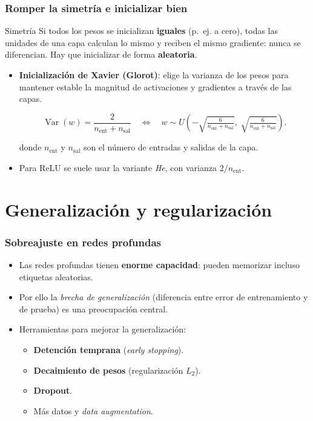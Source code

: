 \documentclass[aspectratio=169, 10pt]{beamer}
\newcommand{\Var}{\operatorname{Var}}
\newcommand{\formula}[1]{%
	\begin{tcolorbox}[colback=UCMBlue!8, colframe=UCMBlue, arc=4pt,
		boxsep=2pt, left=6pt, right=6pt, top=3pt, bottom=3pt]
		#1
	\end{tcolorbox}
}
\begin{document}
\begin{frame}
\frametitle{Romper la simetr\'ia e inicializar bien}
\begin{block}{Simetr\'ia}
Si todos los pesos se inicializan \textbf{iguales} (p.~ej. a cero), todas las unidades de una capa calculan lo mismo y reciben el mismo gradiente: nunca se diferencian. Hay que inicializar de forma \textbf{aleatoria}.
\end{block}
\pause
\begin{itemize}
	\item \textbf{Inicializaci\'on de Xavier (Glorot)}: elige la varianza de los pesos para mantener estable la magnitud de activaciones y gradientes a trav\'es de las capas.
	\formula{\[
	\Var(w) = \frac{2}{n_{\text{ent}}+n_{\text{sal}}}
	\quad\Longleftrightarrow\quad
	w \sim U\!\left(-\sqrt{\tfrac{6}{n_{\text{ent}}+n_{\text{sal}}}},\; \sqrt{\tfrac{6}{n_{\text{ent}}+n_{\text{sal}}}}\right).
	\]}
	donde $n_{\text{ent}}$ y $n_{\text{sal}}$ son el n\'umero de entradas y salidas de la capa.
	\pause
	\item Para ReLU se suele usar la variante \emph{He}, con varianza $2/n_{\text{ent}}$.
\end{itemize}
\end{frame}

\section{Generalizaci\'on y regularizaci\'on}

\begin{frame}
\frametitle{Sobreajuste en redes profundas}
\begin{itemize}
	\item Las redes profundas tienen \textbf{enorme capacidad}: pueden memorizar incluso etiquetas aleatorias.
	\pause
	\item Por ello la \emph{brecha de generalizaci\'on} (diferencia entre error de entrenamiento y de prueba) es una preocupaci\'on central.
	\pause
	\item Herramientas para mejorar la generalizaci\'on:
	\begin{itemize}
		\item \textbf{Detenci\'on temprana} (\emph{early stopping}).
		\item \textbf{Decaimiento de pesos} (regularizaci\'on $L_2$).
		\item \textbf{Dropout}.
		\item M\'as datos y \emph{data augmentation}.
	\end{itemize}
\end{itemize}
\end{frame}
\end{document}

